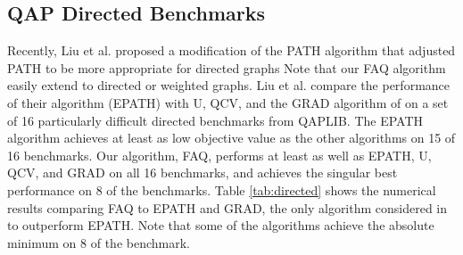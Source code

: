 \documentclass[10pt]{article}
\begin{document}
\subsection{QAP Directed Benchmarks}
\label{sub:directed}


Recently, Liu et al. \cite{Liu2012} proposed a modification of the PATH algorithm that adjusted PATH to be more appropriate for directed graphs
Note that our FAQ algorithm 
easily extend to directed or weighted graphs.
Liu et al. compare the performance of their algorithm (EPATH) with U, QCV, and the GRAD algorithm of \cite{Gold1996} on a set of 16 particularly difficult directed benchmarks from QAPLIB.  The EPATH algorithm achieves at least as low objective value as the other algorithms on 15 of 16 benchmarks.  Our algorithm, FAQ, performs at least as well as EPATH, U, QCV, and GRAD on all 16 benchmarks, and achieves the singular best performance on 8 of the benchmarks.  Table \ref{tab:directed} shows the numerical results comparing FAQ to EPATH and GRAD, the only algorithm considered in \cite{Liu2012} to outperform EPATH.  Note that some of the algorithms achieve the absolute minimum on 8 of the benchmark. 
\end{document}
